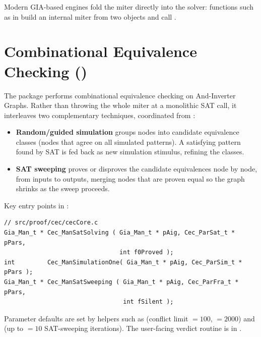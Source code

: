 Modern GIA-based engines fold the miter directly into the solver: functions
such as  in  build an
internal miter from two  objects and call .

\section{Combinational Equivalence Checking ()}

The  package performs combinational equivalence checking on
And-Inverter Graphs. Rather than throwing the whole miter at a monolithic SAT
call, it interleaves two complementary techniques, coordinated from
:

\begin{itemize}
  \item \textbf{Random/guided simulation} groups nodes into candidate
        equivalence classes (nodes that agree on all simulated patterns).
        A satisfying pattern found by SAT is fed back as new simulation
        stimulus, refining the classes.
  \item \textbf{SAT sweeping} proves or disproves the candidate equivalences
        node by node, from inputs to outputs, merging nodes that are proven
        equal so the graph shrinks as the sweep proceeds.
\end{itemize}

Key entry points in :

\begin{lstlisting}[style=abccode]
// src/proof/cec/cecCore.c
Gia_Man_t * Cec_ManSatSolving ( Gia_Man_t * pAig, Cec_ParSat_t * pPars,
                                int f0Proved );
int         Cec_ManSimulationOne( Gia_Man_t * pAig, Cec_ParSim_t * pPars );
Gia_Man_t * Cec_ManSatSweeping ( Gia_Man_t * pAig, Cec_ParFra_t * pPars,
                                 int fSilent );
\end{lstlisting}

Parameter defaults are set by helpers such as 
(conflict limit ${=}100$, ${=}2000$) and
 (up to ${=}10$ SAT-sweeping
iterations). The user-facing verdict routine is  in
.

